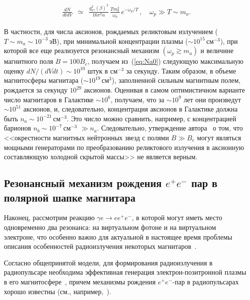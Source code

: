 %
\begin{eqnarray}
\label{eq:Na2}
\frac{dN}{dt dV} &\simeq&  \frac{g_{a\gamma}^2 (\beta)^2}{16 \pi^2 \alpha} \,
\frac{T m_a^2}{\omega_p}  \, e^{-\omega_p/T} \, , \quad \omega_p \gg T \sim m_a.
\end{eqnarray}
%



В частности, для числа аксионов, рождаемых реликтовым излучением 
($T \sim m_a \sim 10^{-3}$\,эВ), при  
 минимальной  концентрации плазмы ($\sim 10^{15}$\,см$^{-3}$), при которой все еще 
 реализуется  резонансный механизм $(\omega_p \gtrsim  m_a)$ и величине магнитного поля 
 $B=100B_e$, получаем из~(\ref{eq:Na0})  
следующую максимальную оценку $dN/(dV dt)\sim 10^{10}$ штук в см$^{-3}$ за секунду. 
 Таким образом, в объеме магнитосферы магнитара 
 ($\sim 10^{19}$\,см$^3$), заполненной сильным магнитным полем,  рождается за секунду 
 $10^{29}$ аксионов. Оценивая в самом оптимистичном варианте 
 число магнитаров в Галактике $\sim 10^6$, получаем, 
 что за $\sim 10^9$ лет они произведут $\sim 10^{51}$ аксионов, и, следовательно, 
 концентрация  аксионов в Галактике должна быть  $n_a \sim 10^{-21}$\,см$^{-3}$. Это число
 можно сравнить, например, с концентрацией барионов $n_b \sim 10^{-7}$\,см$^{-3}$ $\gg n_a$.  
 Следовательно, утверждение автора~\cite{Skobelev:2007} о том, что <<окрестности 
 магнитных нейтронных 
 звезд с полями $B \gg B_e$ могут являться мощными генераторами по преобразованию 
 реликтового излучения в аксионную составляющую холодной скрытой массы>> не является 
 верным.
 
 
 
 \subsection{Резонансный механизм рождения $e^+e^-$ пар  в полярной шапке магнитара}
Наконец, рассмотрим   реакцию $\gamma e \to e e^+e^-$, в которой могут иметь место одновременно два резонанса: 
на виртуальном фотоне и на виртуальном электроне, что особенно важно для актуальной в настоящее время  
проблемы  описания особенностей 
радиоизлучения некоторых магнитаров~\cite{Malofeev:2005r, Malofeev:2005,
Duncan:1995,Thompson:1996,Thompson:2002}.  

Согласно общепринятой модели, для 
формирования радиоизлучения  в радиопульсаре необходима эффективная генерация 
электрон-позитронной плазмы в его магнитосфере~\cite{Ruderman:1975}, 
причем механизмы рождения $e^+e^-$-пар 
в радиопульсарах хорошо известны (см., например,~\cite{Klepikov:1954,Erber:1966}).  

